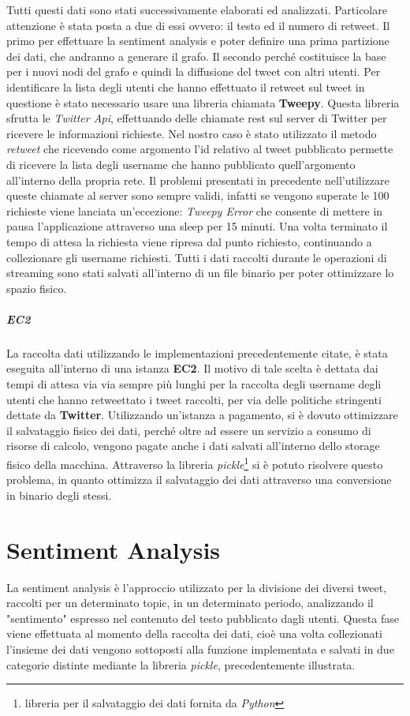 Tutti questi dati sono stati successivamente elaborati ed analizzati. Particolare attenzione è stata posta a due di essi ovvero: il testo ed il numero di retweet. 
Il primo per effettuare la sentiment analysis e poter definire una prima partizione dei dati, che andranno a generare il grafo.
Il secondo perché costituisce la base per i nuovi nodi del grafo e quindi la diffusione del tweet con altri utenti. 
Per identificare la lista degli utenti che hanno effettuato il retweet sul tweet in questione è stato necessario usare una libreria chiamata \textbf{Tweepy}.
Questa libreria sfrutta le \textit{Twitter Api}, effettuando delle chiamate rest sul server di Twitter per ricevere le informazioni richieste. Nel nostro caso è stato utilizzato il metodo \textit{retweet} che ricevendo come argomento l'id relativo al tweet pubblicato permette di ricevere la lista degli username che hanno pubblicato quell'argomento all'interno della propria rete. Il problemi presentati in precedente nell'utilizzare queste chiamate al server sono sempre validi, infatti se vengono superate le 100 richieste viene lanciata un'eccezione: \textit{Tweepy Error} che consente di mettere in pausa l'applicazione attraverso una sleep per 15 minuti. Una volta terminato il tempo di attesa la richiesta viene ripresa dal punto richiesto, continuando a collezionare gli username richiesti.
Tutti i dati raccolti durante le operazioni di streaming sono stati salvati all'interno di un file binario per poter ottimizzare lo spazio fisico.

\subparagraph{EC2}
La raccolta dati utilizzando le implementazioni precedentemente citate, è stata eseguita all'interno di una istanza \textbf{EC2}. 
Il motivo di tale scelta è dettata dai tempi di attesa via via sempre più lunghi per la raccolta degli username degli utenti che hanno retweettato i tweet raccolti, per via delle politiche stringenti dettate da \textbf{Twitter}.  Utilizzando un'istanza a pagamento, si è dovuto ottimizzare il salvataggio fisico dei dati, perché oltre ad essere un servizio a consumo di risorse di calcolo, vengono pagate anche i dati salvati all'interno dello storage fisico della macchina. Attraverso la libreria \textit{pickle}\footnote{libreria per il salvataggio dei dati fornita da \textit{Python}} si è potuto risolvere questo problema, in quanto ottimizza il salvataggio dei dati attraverso una conversione in binario degli stessi.


\section{Sentiment Analysis}
La sentiment analysis è l'approccio utilizzato per la divisione dei diversi tweet, raccolti per un determinato topic, in un determinato periodo, analizzando il "sentimento" espresso nel contenuto del testo pubblicato dagli utenti.
Questa fase viene effettuata al momento della raccolta dei dati, cioè una volta collezionati l'insieme dei dati vengono sottoposti alla funzione implementata e salvati in due categorie distinte mediante la libreria \textit{pickle}, precedentemente illustrata.

